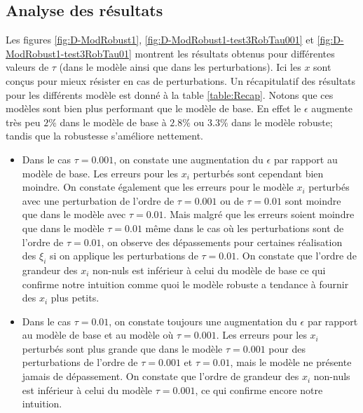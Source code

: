 \subsection{Analyse des résultats}
Les figures \ref{fig:D-ModRobust1}, \ref{fig:D-ModRobust1-test3RobTau001} et \ref{fig:D-ModRobust1-test3RobTau01} montrent les résultats obtenus pour différentes valeurs de $\tau$ (dans le modèle ainsi que dans les perturbations). Ici les $x$ sont conçus pour mieux résister en cas de perturbations. Un récapitulatif des résultats pour les différents modèle est donné à la table \ref{table:Recap}. Notons que ces modèles sont bien plus performant que le modèle de base. En effet le $\epsilon$ augmente très peu $2\%$ dans le modèle de base à $2.8\%$ ou $3.3\%$ dans le modèle robuste; tandis que la robustesse s'améliore nettement.\\
\begin{itemize}
\item Dans le cas $\tau = 0.001$, on constate une augmentation du $\epsilon$ par rapport au modèle de base. Les erreurs pour les $x_i$ perturbés sont cependant bien moindre. On constate également que les erreurs pour le modèle $x_i$ perturbés avec une perturbation de l'ordre de $\tau=0.001$ ou de $\tau = 0.01$ sont moindre que dans le modèle avec $\tau=0.01$. Mais malgré que les erreurs soient moindre que dans le modèle $\tau = 0.01$ même dans le cas où les perturbations sont de l'ordre de $\tau =0.01$, on  observe des dépassements pour certaines réalisation des $\xi_i$ si on applique les perturbations de $\tau=0.01$. On constate que l'ordre de grandeur des $x_i$ non-nuls est inférieur à celui du modèle de base ce qui confirme notre intuition comme quoi le modèle robuste a tendance à fournir des $x_i$ plus petits.\\ 
 \item Dans le cas $\tau = 0.01$, on constate toujours une augmentation du $\epsilon$ par rapport au modèle de base et au modèle où $\tau = 0.001$. Les erreurs pour les $x_i$ perturbés sont plus grande que dans le modèle $\tau=0.001$ pour des perturbations de l'ordre de $\tau = 0.001$ et $\tau=0.01$, mais le modèle ne présente jamais de dépassement. On constate que l'ordre de grandeur des $x_i$ non-nuls est inférieur à celui du modèle $\tau=0.001$, ce qui confirme encore notre intuition.
\end{itemize}

